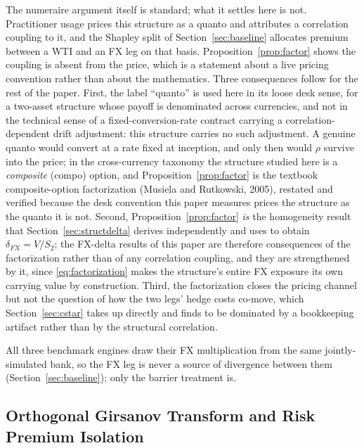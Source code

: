 \documentclass[11pt,a4paper]{article}
\begin{document}
The numeraire argument itself is standard; what it settles here is not. Practitioner usage prices this structure as a quanto and attributes a correlation coupling to it, and the Shapley split of Section~\ref{sec:baseline} allocates premium between a WTI and an FX leg on that basis. Proposition~\ref{prop:factor} shows the coupling is absent from the price, which is a statement about a live pricing convention rather than about the mathematics. Three consequences follow for the rest of the paper. First, the label ``quanto'' is used here in its loose desk sense, for a two-asset structure whose payoff is denominated across currencies, and not in the technical sense of a fixed-conversion-rate contract carrying a correlation-dependent drift adjustment: this structure carries no such adjustment. A genuine quanto would convert at a rate fixed at inception, and only then would $\rho$ survive into the price; in the cross-currency taxonomy the structure studied here is a \emph{composite} (compo) option, and Proposition~\ref{prop:factor} is the textbook composite-option factorization (Musiela and Rutkowski, 2005), restated and verified because the desk convention this paper measures prices the structure as the quanto it is not. Second, Proposition~\ref{prop:factor} \emph{is} the homogeneity result that Section~\ref{sec:structdelta} derives independently and uses to obtain $\delta_{FX}=V/S_2$; the FX-delta results of this paper are therefore consequences of the factorization rather than of any correlation coupling, and they are strengthened by it, since \eqref{eq:factorization} makes the structure's entire FX exposure its own carrying value by construction. Third, the factorization closes the pricing channel but not the question of how the two legs' hedge costs co-move, which Section~\ref{sec:cstar} takes up directly and finds to be dominated by a bookkeeping artifact rather than by the structural correlation.

All three benchmark engines draw their FX multiplication from the same jointly-simulated bank, so the FX leg is never a source of divergence between them (Section~\ref{sec:baseline}); only the barrier treatment is.

\subsection{Orthogonal Girsanov Transform and Risk Premium Isolation}
\label{sec:girsanov}
\end{document}
